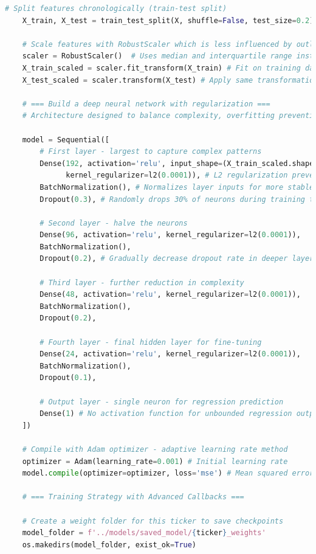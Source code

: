 \documentclass[12pt]{article}
\begin{document}
\begin{lstlisting}[language=Python]
    # Split features chronologically (train-test split)
    X_train, X_test = train_test_split(X, shuffle=False, test_size=0.2)

    # Scale features with RobustScaler which is less influenced by outliers than StandardScaler
    scaler = RobustScaler()  # Uses median and interquartile range instead of mean and variance
    X_train_scaled = scaler.fit_transform(X_train) # Fit on training data only
    X_test_scaled = scaler.transform(X_test) # Apply same transformation to test data
    
    # === Build a deep neural network with regularization ===
    # Architecture designed to balance complexity, overfitting prevention, and learning capacity
    
    model = Sequential([
        # First layer - largest to capture complex patterns
        Dense(192, activation='relu', input_shape=(X_train_scaled.shape[1],), 
              kernel_regularizer=l2(0.0001)), # L2 regularization prevents large weights
        BatchNormalization(), # Normalizes layer inputs for more stable training
        Dropout(0.3), # Randomly drops 30% of neurons during training to prevent overfitting
        
        # Second layer - halve the neurons
        Dense(96, activation='relu', kernel_regularizer=l2(0.0001)), 
        BatchNormalization(),
        Dropout(0.2), # Gradually decrease dropout rate in deeper layers
        
        # Third layer - further reduction in complexity
        Dense(48, activation='relu', kernel_regularizer=l2(0.0001)), 
        BatchNormalization(),
        Dropout(0.2),

        # Fourth layer - final hidden layer for fine-tuning
        Dense(24, activation='relu', kernel_regularizer=l2(0.0001)), 
        BatchNormalization(),
        Dropout(0.1),
        
        # Output layer - single neuron for regression prediction
        Dense(1) # No activation function for unbounded regression output
    ])
    
    # Compile with Adam optimizer - adaptive learning rate method
    optimizer = Adam(learning_rate=0.001) # Initial learning rate
    model.compile(optimizer=optimizer, loss='mse') # Mean squared error loss for regression

    # === Training Strategy with Advanced Callbacks ===
    
    # Create a weight folder for this ticker to save checkpoints
    model_folder = f'../models/saved_model/{ticker}_weights'
    os.makedirs(model_folder, exist_ok=True)
    

\end{lstlisting}
\end{document}
